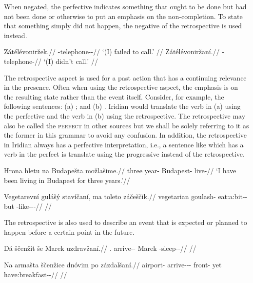 When negated, the perfective indicates something that ought to be done but had
not been done or otherwise to put an emphasis on the non-completion. To state
that something simply did not happen, the negative of the retrospective is used
instead.

\begin{multicols}{2}
\pex
\a\begingl
\gla Zátélévoniržek.//
\glb \Neg{}-telephone-\Av{}-\Pf{}//
\glft `(I) failed to call.' //
\endgl
\a\begingl
\gla Zátélévoniržaní.//
\glb \Neg{}-telephone-//
\glft `(I) didn't call.' //
\endgl
\xe
\end{multicols}

The retrospective aspect is used for a past action that has a continuing
relevance in the presence. Often when using the retrospective aspect, the
emphasis is on the resulting state rather than the event itself. Consider, for
example, the following sentences: (a) ; and
(b) . Iridian would translate the
verb in (a) using the perfective and the verb in (b) using the retrospective.
The retrospective may also be called the {\scshape perfect} in other sources but
we shall be solely referring to it as the former in this grammar to avoid any
confusion. In addition, the retrospective in Iridian always has a perfective
interpretation, i.e., a sentence like 
which has a verb in the perfect is translate using the progressive instead of
the retrospective.

\pex
\begingl
\gla Hrona hletu na Budapešta možlašime.//
\glb three year-\Ins{} \Loc{} Budapest-\Acc{} live-//
\glft `I have been living in Budapest for three years.'//
\endgl
\xe

\pex
\begingl
\gla Vegetarevní gulášý stavíčaní, ma toleto záčeščik.//
\glb vegetarian goulash-\Gen{} eat:a:bit-\Av{}-\Ret{} but \Aff{} \Neg{}-like-\Av{}-\Pf{}-\Quot{}//
\glft {} //
\endgl
\xe

The retrospective is also used to describe an event that is expected or planned
to happen before a certain point in the future.

\pex
\begingl
\gla Dá ščenžit še Marek uzdravžaní.//
\glb \First{}\Sg{}.\Str{} arrive-\Av{}-\SupP{} \Com{} Marek \Refl{}-sleep-\Av{}-\Ret{}//
\glft {} //
\endgl
\xe

\pex
\begingl
\gla Na armašta ščenžice dnóvim po zázdalšaní.//
\glb \Loc{} airport-\Acc{} arrive-\Av{}-\SupP{}-\Att{} front-\Ins{} yet have:breakfast-\Av{}-\Ret{}//
\glft {} //
\endgl
\xe

